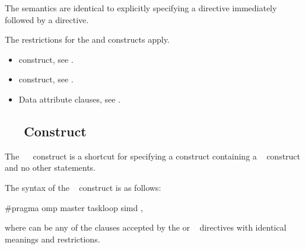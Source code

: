 \descr
The semantics are identical to explicitly specifying a  directive 
immediately followed by a  directive. 

\restrictions
The restrictions for the  and  constructs apply.

\crossreferences
\begin{itemize}
\item {} construct, see
.

\item {} construct, see
.

\item Data attribute clauses, see
.
\end{itemize}





\subsection{~~ Construct}
\label{subsec:master taskloop simd Construct}

\summary
The ~~ construct is a shortcut for 
specifying a  construct containing a ~ 
construct and no other statements.

\syntax
\begin{ccppspecific}
The syntax of the ~ construct is as follows:

\begin{ompcPragma}[fontsize=\small]
#pragma omp master taskloop simd \plc{[clause[ [},\plc{] clause] ... ] new-line}
\end{ompcPragma}

where  can be any of the clauses accepted by the  or
~ directives with identical meanings and restrictions.
\end{ccppspecific}

